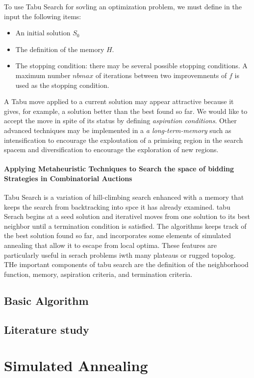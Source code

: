  To use Tabu Search for sovling an optimization problem, we must define in the input the following items:
 \begin{itemize}
 \item An initial solution $S_0$
 \item The definition of the memory $H$.
 \item The stopping condition: there may be several possible stopping conditions. A maximum number $nbmax$ of iterations between two improvemnents of $f$ is used as the stopping condition.
 \end{itemize}

A Tabu move applied to a current solution may appear attractive because it gives, for example, a solution better than the best found so far. We would like to accept the move in spite of its status by defining \emph{aspiration conditions}. Other advanced techniques may be implemented in a \emph{a long-term-memory} such as intensification to encourage the exploutation of a primising region in the search spacem and diversification to encourage the exploration of new regions.
\paragraph{Applying Metaheuristic Techniques to Search the space of bidding Strategies in Combinatorial Auctions}
Tabu Search is a variation of hill-climbing search enhanced with a memory that keeps the search from backtracking into spce it has already examined. tabu Serach begins at a seed solution and iterativel moves from one solution to its best neighbor until a termination condition is satisfied. The algorithms keeps track of the best solution found so far, and incorporates some elements of simulated annealing that allow it to escape from local optima. These features are particularly useful in serach problems iwth many plateaus  or rugged topolog. THe important components of tabu search are the definition of the neighborhood function, memory, aspiration criteria, and termination criteria.
\subsection{Basic Algorithm}

\subsection{Literature study}

\section{Simulated Annealing}


